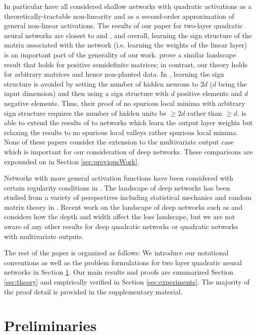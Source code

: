 \documentclass[11pt]{article}
\theoremstyle{plain}
\theoremstyle{plain}
\numberwithin{equation}{section}
\numberwithin{lemma}{section}
\numberwithin{theorem}{section}
\numberwithin{corollary}{section}
\numberwithin{observation}{section}
\numberwithin{definition}{section}
\numberwithin{example}{section}
\begin{document}
In particular \cite{livni2014computational, algReg18, JS19, du2018power, venturi2019spurious} have all considered shallow networks with quadratic activations as a theoretically-tractable non-linearity and as a second-order approximation of general non-linear activations. The results of our paper for two-layer quadratic neural networks are closest to \cite{JS19} and \cite{venturi2019spurious}, and overall, learning the sign structure of the matrix associated with the network (i.e. learning the weights of the linear layer) is an important part of the generality of our work. \cite{du2018power} prove a similar landscape result that holds for positive semidefinite matrices; in contrast, our theory holds for arbitrary matrices and hence non-planted data. In \cite{JS19}, learning the sign structure is avoided by setting the number of hidden neurons to $2d$ ($d$ being the input dimension) and then using a sign structure with $d$ positive elements and $d$ negative elements.  Thus, their proof of no spurious local minima with arbitrary sign structure requires the number of hidden units be $\geq 2d$ rather than $\geq d$.  \cite{venturi2019spurious} is able to extend the results of \cite{JS19} to networks which learn the output layer weights but relaxing the results to no spurious local valleys rather spurious local minima.  None of these papers consider the extension to the multivariate output case which is important for our consideration of deep networks. These comparisons are expounded on in Section \ref{sec:previousWork}.

Networks with more general activation functions have been considered with certain regularity conditions in \cite{soudry2016no, nguyen2017loss}. The landscape of deep networks has been studied from a variety of perspectives including statistical mechanics and random matrix theory in \cite{choromanska2015loss, dauphin2014identifying, pennington2017geometry, bahri2020statistical}. Recent work on the landscape of deep networks such as \cite{kawaguchi2019depth} and \cite{kawaguchi2019effect} considers how the depth and width affect the loss landscape, but we are not aware of any other results for deep quadratic networks or quadratic networks with multivariate outputs.  

The rest of the paper is organized as follows: We introduce our notational conventions as well as the problem formulations for two layer quadratic neural networks in Section \ref{sec:notation}. Our main results and proofs are summarized Section \ref{sec:theory} and empirically verified in Section \ref{sec:experiments}. The majority of the proof detail is provided in the supplementary material. \section{Preliminaries}
\label{sec:notation}
\end{document}
